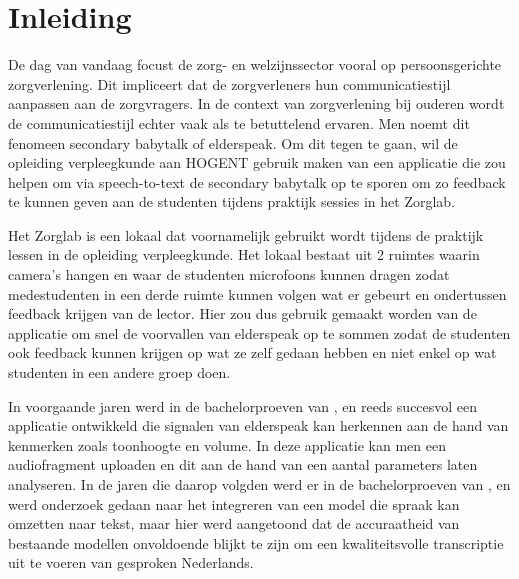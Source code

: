 


% 

\section{Inleiding}%
\label{sec:inleiding}

De dag van vandaag focust de zorg- en welzijnssector vooral op persoonsgerichte zorgverlening. Dit impliceert dat de zorgverleners hun communicatiestijl aanpassen aan de zorgvragers. In de context van zorgverlening bij ouderen wordt de communicatiestijl echter vaak als te betuttelend ervaren. Men noemt dit fenomeen secondary babytalk of elderspeak. Om dit tegen te gaan, wil de opleiding verpleegkunde aan HOGENT gebruik maken van een applicatie die zou helpen om via speech-to-text de secondary babytalk op te sporen om zo feedback te kunnen geven aan de studenten tijdens praktijk sessies in het Zorglab.

Het Zorglab is een lokaal dat voornamelijk gebruikt wordt tijdens de praktijk lessen in de opleiding verpleegkunde. Het lokaal bestaat uit 2 ruimtes waarin camera's hangen en waar de studenten microfoons kunnen dragen zodat medestudenten in een derde ruimte kunnen volgen wat er gebeurt en ondertussen feedback krijgen van de lector. Hier zou dus gebruik gemaakt worden van de applicatie om snel de voorvallen van elderspeak op te sommen zodat de studenten ook feedback kunnen krijgen op wat ze zelf gedaan hebben en niet enkel op wat studenten in een andere groep doen.

In voorgaande jaren werd in de bachelorproeven van \textcite{Govaerts2022}, \textcite{Gussem2022} en \textcite{Daems2023} reeds succesvol een applicatie ontwikkeld die signalen van elderspeak kan herkennen aan de hand van kenmerken zoals toonhoogte en volume. In deze applicatie kan men een audiofragment uploaden en dit aan de hand van een aantal parameters laten analyseren. In de jaren die daarop volgden werd er in de bachelorproeven van \textcite{Branden2024}, \textcite{Coetsiers2024} en \textcite{Schryver2024} werd onderzoek gedaan naar het integreren van een model die spraak kan omzetten naar tekst, maar hier werd aangetoond dat de accuraatheid van bestaande modellen onvoldoende blijkt te zijn om een kwaliteitsvolle transcriptie uit te voeren van gesproken Nederlands.

